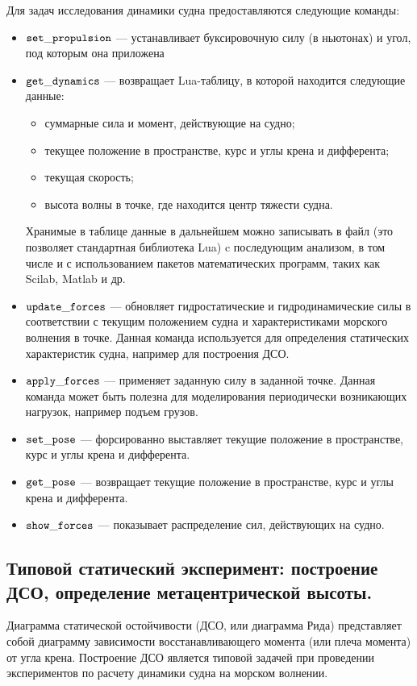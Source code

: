 Для задач исследования динамики судна предоставляются следующие команды:
\begin{itemize}
	\item	$\tt set\_propulsion$ --- устанавливает буксировочную силу (в ньютонах) и угол, 
			под которым она приложена
	\item	$\tt get\_dynamics$ --- возвращает Lua-таблицу, в которой находится следующие данные:
	\begin{itemize}
		\item	суммарные сила и момент, действующие на судно;
		\item	текущее положение в пространстве, курс и углы крена и дифферента;
		\item	текущая скорость;
		\item	высота волны в точке, где находится центр тяжести судна.
	\end{itemize}
	Хранимые в таблице данные в дальнейшем можно записывать 
	в файл (это позволяет стандартная библиотека Lua) c последующим анализом, 
	в том числе и с использованием пакетов математических программ, таких как Scilab, Matlab и др.
	\item	$\tt update\_forces$ --- обновляет гидростатические и гидродинамические силы
			в соответствии с текущим положением судна и характеристиками морского волнения в точке. 
			Данная команда используется для определения статических характеристик судна, 
			например для построения ДСО.
	\item	$\tt apply\_forces$ --- применяет заданную силу в заданной точке. 
			Данная команда может быть полезна для моделирования периодически возникающих нагрузок, 
			например подъем грузов.
	\item	$\tt set\_pose$ --- форсированно выставляет текущие положение в пространстве, курс и 
			углы крена и дифферента.
	\item	$\tt get\_pose$ --- возвращает текущие положение в пространстве, курс и углы крена 
			и дифферента.
	\item	$\tt show\_forces$ --- показывает распределение сил, действующих на судно.
\end{itemize}



\subsection{Типовой статический эксперимент: построение ДСО, определение метацентрической высоты.}

Диаграмма статической остойчивости (ДСО, или диаграмма Рида) представляет собой диаграмму зависимости восстанавливающего момента (или плеча момента) от угла крена.
Построение ДСО является типовой задачей при проведении экспериментов по расчету динамики судна на морском волнении.

